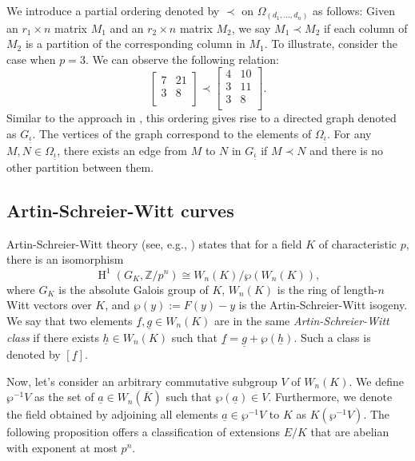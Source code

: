 \documentclass{compositio}
\theoremstyle{remark}
\theoremstyle{remark}
\DeclareMathOperator{\cohom}{H}
\begin{document}
We introduce a partial ordering denoted by $\prec$ on $\Omega_{(d_1,\ldots,d_n)}$ as follows: Given an $r_1\times n$ matrix $M_1$ and an $r_2\times n$ matrix $M_2$, we say $M_1 \prec M_2$ if each column of $M_2$ is a partition of the corresponding column in $M_1$. To illustrate, consider the case when $p=3$. We can observe the following relation:
\[  \begin{bmatrix}
7 & 21 \\
3 & 8 \\
\end{bmatrix} \prec \begin{bmatrix}
   4 & 10 \\
   3 & 11 \\
   3 & 8\\
   \end{bmatrix}.  \]
Similar to the approach in \cite{MR2985514}, this ordering gives rise to a directed graph denoted as $G_{\underline{\iota}}$. The vertices of the graph correspond to the elements of $\Omega_{\underline{\iota}}$. For any $M, N \in \Omega_{\underline{\iota}}$, there exists an edge from $M$ to $N$ in $G_{\underline{\iota}}$ if $M \prec N$ and there is no other partition between them.




\subsection{Artin-Schreier-Witt curves}
\label{secASWcurves}

Artin-Schreier-Witt theory (see, e.g., \cite{MR1878556}) states that for a field $K$ of characteristic $p$, there is an isomorphism
\[ \cohom^1(G_K, \mathbb{Z}/p^n) \cong W_n(K)/\wp (W_n(K)),\] 
where $G_K$ is the absolute Galois group of $K$, $W_n(K)$ is the ring of length-$n$ Witt vectors over $K$, and $\wp(y):=F(y)-y$ is the Artin-Schreier-Witt isogeny. We say that two elements $\underline{f}, \underline{g} \in W_n(K)$ are in the same \textit{Artin-Schreier-Witt class} if there exists $\underline{h} \in W_n(K)$ such that $\underline{f}=\underline{g}+\wp(\underline{h})$. Such a class is denoted by $[\underline{f}]$.

Now, let's consider an arbitrary commutative subgroup $V$ of $W_n(K)$. We define $\wp^{-1}V$ as the set of $\underline{a} \in W_n(\overline{K})$ such that $\wp(\underline{a}) \in V$. Furthermore, we denote the field obtained by adjoining all elements $\underline{a}\in \wp^{-1}V$ to $K$ as $K(\wp^{-1}V)$. The following proposition offers a classification of extensions $E/K$ that are abelian with exponent at most $p^n$.
\end{document}
